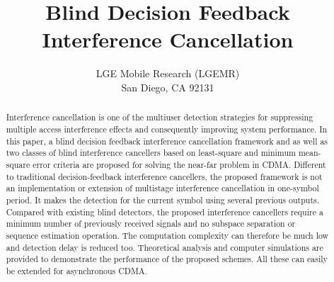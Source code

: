 \documentclass[a4paper,10pt,fleqn, twocolumn]{IEEETran}
\title{Blind Decision Feedback Interference Cancellation}
\author{LGE Mobile Research (LGEMR)\\San Diego, CA 92131}
\date{}
\begin{document}
\maketitle
\begin{abstract}\small
Interference cancellation is one of the multiuser detection
strategies for suppressing multiple access interference effects
and consequently improving system performance. In this paper, a
blind decision feedback interference cancellation framework and as
well as two classes of blind interference cancellers based on
least-square and minimum mean-square error criteria are proposed
for solving the near-far problem in CDMA. Different to traditional
decision-feedback interference cancellers, the proposed framework
is not an implementation or extension of multistage interference
cancellation in one-symbol period. It makes the detection for the
current symbol using several previous outputs. Compared with
existing blind detectors, the proposed interference cancellers
require a minimum number of previously received signals and no
subspace separation or sequence estimation operation. The
computation complexity can therefore be much low and detection
delay is reduced too. Theoretical analysis and computer
simulations are provided to demonstrate the performance of the
proposed schemes. All these can easily be extended for
asynchronous CDMA.
\end{abstract}
\end{document}
